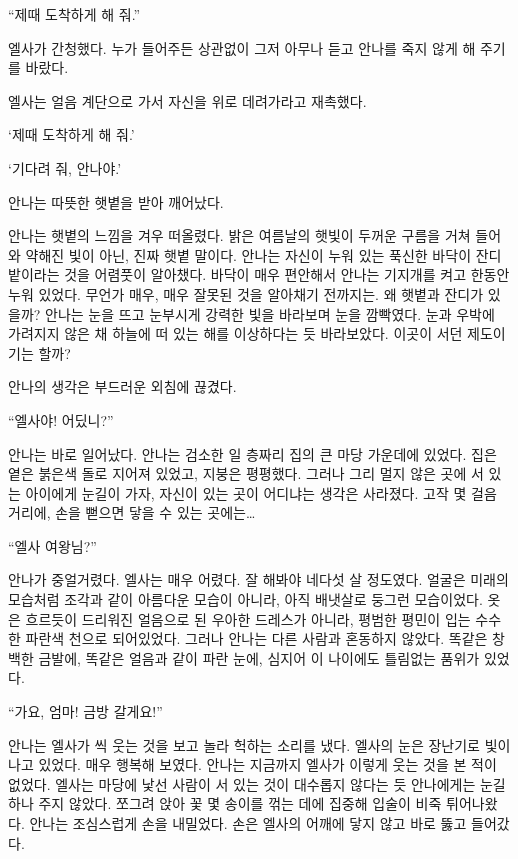 ``제때 도착하게 해 줘.''

엘사가 간청했다. 누가 들어주든 상관없이 그저 아무나 듣고 안나를 죽지 않게 해 주기를 바랐다.

엘사는 얼음 계단으로 가서 자신을 위로 데려가라고 재촉했다.

`제때 도착하게 해 줘.'

` 기다려 줘, 안나야.'

\textbreak

안나는 따뜻한 햇볕을 받아 깨어났다.

안나는 햇볕의 느낌을 겨우 떠올렸다. 밝은 여름날의 햇빛이 두꺼운 구름을 거쳐 들어와 약해진 빛이 아닌, 진짜 햇볕 말이다. 안나는 자신이 누워 있는 푹신한 바닥이 잔디밭이라는 것을 어렴풋이 알아챘다. 바닥이 매우 편안해서 안나는 기지개를 켜고 한동안 누워 있었다. 무언가 매우, 매우 잘못된 것을 알아채기 전까지는. 왜 햇볕과 잔디가 있을까? 안나는 눈을 뜨고 눈부시게 강력한 빛을 바라보며 눈을 깜빡였다. 눈과 우박에 가려지지 않은 채 하늘에 떠 있는 해를 이상하다는 듯 바라보았다. 이곳이 서던 제도이기는 할까?

안나의 생각은 부드러운 외침에 끊겼다.

``엘사야! 어딨니?''

안나는 바로 일어났다. 안나는 검소한 일 층짜리 집의 큰 마당 가운데에 있었다. 집은 옅은 붉은색 돌로 지어져 있었고, 지붕은 평평했다. 그러나 그리 멀지 않은 곳에 서 있는 아이에게 눈길이 가자, 자신이 있는 곳이 어디냐는 생각은 사라졌다. 고작 몇 걸음 거리에, 손을 뻗으면 닿을 수 있는 곳에는\ldots

``엘사 여왕님?''

안나가 중얼거렸다. 엘사는 매우 어렸다. 잘 해봐야 네다섯 살 정도였다. 얼굴은 미래의 모습처럼 조각과 같이 아름다운 모습이 아니라, 아직 배냇살로 둥그런 모습이었다. 옷은 흐르듯이 드리워진 얼음으로 된 우아한 드레스가 아니라, 평범한 평민이 입는 수수한 파란색 천으로 되어있었다. 그러나 안나는 다른 사람과 혼동하지 않았다. 똑같은 창백한 금발에, 똑같은 얼음과 같이 파란 눈에, 심지어 이 나이에도 틀림없는 품위가 있었다.

``가요, 엄마! 금방 갈게요!''

안나는 엘사가 씩 웃는 것을 보고 놀라 헉하는 소리를 냈다. 엘사의 눈은 장난기로 빛이 나고 있었다. 매우 행복해 보였다. 안나는 지금까지 엘사가 이렇게 웃는 것을 본 적이 없었다. 엘사는 마당에 낯선 사람이 서 있는 것이 대수롭지 않다는 듯 안나에게는 눈길 하나 주지 않았다. 쪼그려 앉아 꽃 몇 송이를 꺾는 데에 집중해 입술이 비죽 튀어나왔다. 안나는 조심스럽게 손을 내밀었다. 손은 엘사의 어깨에 닿지 않고 바로 뚫고 들어갔다.

